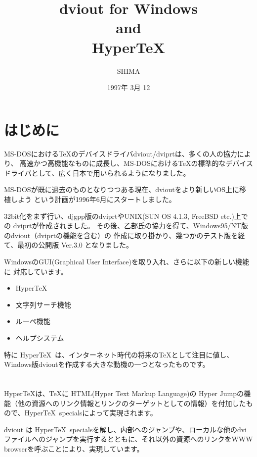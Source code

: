 \title{dviout for Windows\\
       and\\
       Hyper\TeX}
\author{SHIMA}
\date{1997年 3月 12}

\maketitle
\section{はじめに}

MS-DOSにおける\TeX のデバイスドライバdviout/dviprtは、多くの人の協力により、
高速かつ高機能なものに成長し、MS-DOSにおける\TeX の標準的なデバイス
ドライバとして、広く日本で用いられるようになりました。

MS-DOSが既に過去のものとなりつつある現在、dvioutをより新しいOS上に移植しよう
という計画が1996年6月にスタートしました。

32bit化をまず行い、djgpp版のdviprtやUNIX(SUN OS 4.1.3, FreeBSD etc.)上での
dviprtが作成されました。
その後、乙部氏の協力を得て、Windows95/NT版のdviout（dviprtの機能を含む）の
作成に取り掛かり、幾つかのテスト版を経て、最初の公開版 Ver.3.0 となりました。

WindowsのGUI(Graphical User Interface)を取り入れ、さらに以下の新しい機能に
対応しています。

\begin{itemize}
\item Hyper\TeX
\item 文字列サーチ機能
\item ルーペ機能
\item ヘルプシステム
\end{itemize}

特に Hyper\TeX\ は、インターネット時代の将来の\TeX として注目に値し、
Windows版dvioutを作成する大きな動機の一つとなったものです。

\section{}

Hyper\TeX は、\TeX に HTML(Hyper Text Markup Language)の Hyper Jumpの機能（他の資源へのリンク情報とリンクのターゲットとしての情報）を付加したもので、Hyper\TeX \ specialsによって実現されます。

dviout は Hyper\TeX\ specialsを解し、内部へのジャンプや、ローカルな他のdviファイルへのジャンプを実行するとともに、それ以外の資源へのリンクをWWW browserを呼ぶことにより、実現しています。
\medskip

